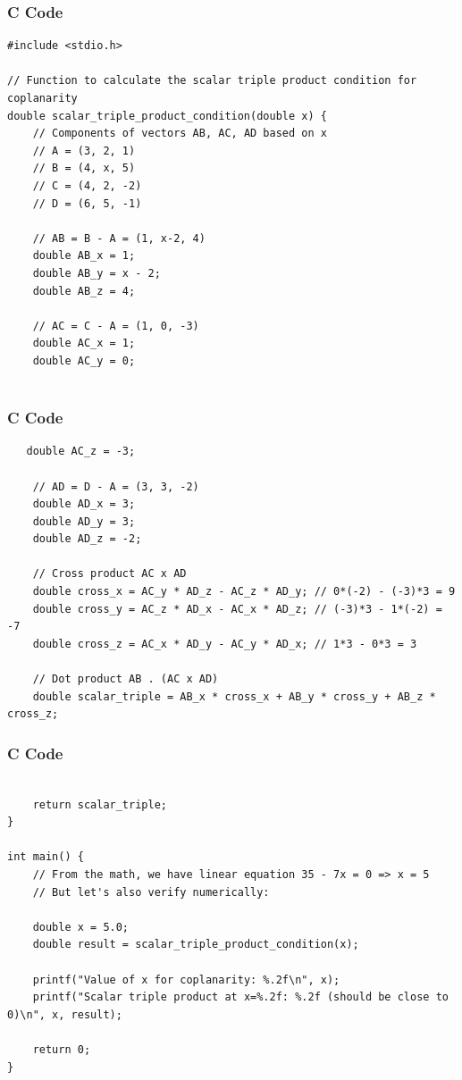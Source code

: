 \documentclass{beamer}
\begin{document}
\begin{frame}[fragile]
    \frametitle{C Code }

    \begin{lstlisting}
#include <stdio.h>

// Function to calculate the scalar triple product condition for coplanarity
double scalar_triple_product_condition(double x) {
    // Components of vectors AB, AC, AD based on x
    // A = (3, 2, 1)
    // B = (4, x, 5)
    // C = (4, 2, -2)
    // D = (6, 5, -1)

    // AB = B - A = (1, x-2, 4)
    double AB_x = 1;
    double AB_y = x - 2;
    double AB_z = 4;

    // AC = C - A = (1, 0, -3)
    double AC_x = 1;
    double AC_y = 0;
    

     \end{lstlisting}
\end{frame}
\begin{frame}[fragile]
    \frametitle{C Code }

    \begin{lstlisting}
   double AC_z = -3;

    // AD = D - A = (3, 3, -2)
    double AD_x = 3;
    double AD_y = 3;
    double AD_z = -2;

    // Cross product AC x AD
    double cross_x = AC_y * AD_z - AC_z * AD_y; // 0*(-2) - (-3)*3 = 9
    double cross_y = AC_z * AD_x - AC_x * AD_z; // (-3)*3 - 1*(-2) = -7
    double cross_z = AC_x * AD_y - AC_y * AD_x; // 1*3 - 0*3 = 3

    // Dot product AB . (AC x AD)
    double scalar_triple = AB_x * cross_x + AB_y * cross_y + AB_z * cross_z;

    \end{lstlisting}
\end{frame}
\begin{frame}[fragile]
    \frametitle{C Code }

    \begin{lstlisting}
    
    return scalar_triple;
}

int main() {
    // From the math, we have linear equation 35 - 7x = 0 => x = 5
    // But let's also verify numerically:

    double x = 5.0;
    double result = scalar_triple_product_condition(x);

    printf("Value of x for coplanarity: %.2f\n", x);
    printf("Scalar triple product at x=%.2f: %.2f (should be close to 0)\n", x, result);

    return 0;
}

    \end{lstlisting}
\end{frame}
\end{document}
